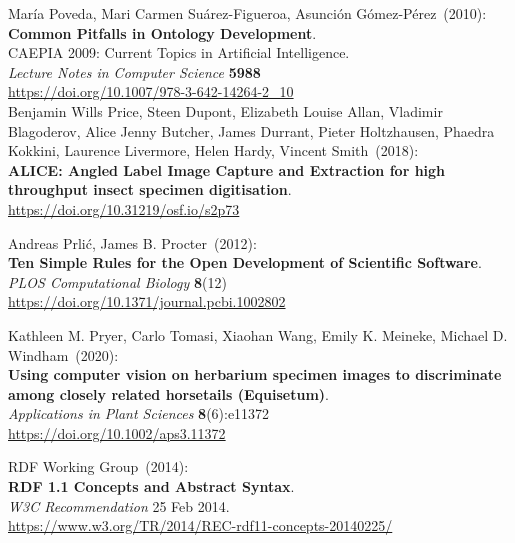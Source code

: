 \begin{thebibliography}{9}
María Poveda, Mari Carmen Suárez-Figueroa, Asunción Gómez-Pérez~(2010): \\
\textbf{Common Pitfalls in Ontology Development}.\\
CAEPIA 2009: Current Topics in Artificial Intelligence.\\
\emph{Lecture Notes in Computer Science} \textbf{5988}\\
\url{https://doi.org/10.1007/978-3-642-14264-2_10}\\

Benjamin Wills Price, Steen Dupont, Elizabeth Louise Allan, Vladimir Blagoderov, Alice Jenny Butcher, James Durrant, Pieter Holtzhausen, Phaedra Kokkini, Laurence Livermore, Helen Hardy, Vincent Smith~(2018): \\
\textbf{ALICE: Angled Label Image Capture and Extraction
for high throughput insect specimen digitisation}.\\
\url{https://doi.org/10.31219/osf.io/s2p73}


Andreas Prlić, James B. Procter~(2012):\\
\textbf{Ten Simple Rules for the Open Development of Scientific Software}.\\
\emph{PLOS Computational Biology} \textbf{8}(12) \\
\url{https://doi.org/10.1371/journal.pcbi.1002802}

Kathleen M. Pryer, Carlo Tomasi, Xiaohan Wang, Emily K. Meineke, Michael D. Windham~(2020): \\
\textbf{Using computer vision on herbarium specimen images
to discriminate among closely related horsetails (Equisetum)}.\\
\emph{Applications in Plant Sciences} \textbf{8}(6):e11372\\
\url{https://doi.org/10.1002/aps3.11372}

RDF Working Group~(2014): \\
\textbf{RDF 1.1 Concepts and Abstract Syntax}.\\
\emph{W3C Recommendation} 25 Feb 2014.\\
\url{https://www.w3.org/TR/2014/REC-rdf11-concepts-20140225/}


\end{thebibliography}
